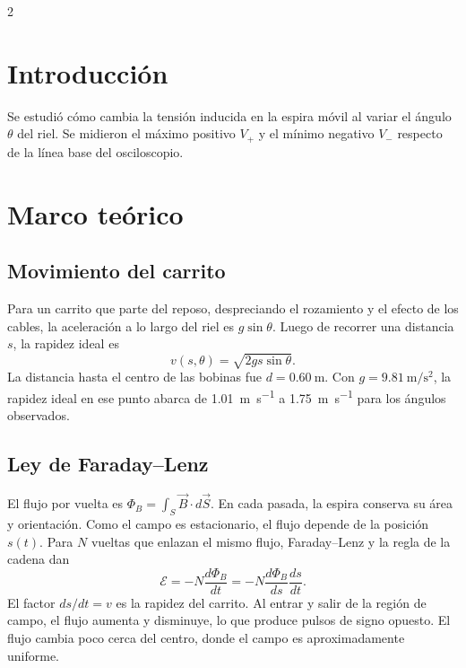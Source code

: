\documentclass[10pt,letterpaper]{article}
\begin{document}
\begin{multicols}{2}
\raggedcolumns
\section{Introducción}
Se estudió cómo cambia la tensión inducida en la espira móvil al variar el ángulo $\theta$ del riel. Se midieron el máximo positivo $V_+$ y el mínimo negativo $V_-$ respecto de la línea base del osciloscopio.

\section{Marco teórico}
\subsection{Movimiento del carrito}
Para un carrito que parte del reposo, despreciando el rozamiento y el efecto de los cables, la aceleración a lo largo del riel es $g\sin\theta$. Luego de recorrer una distancia $s$, la rapidez ideal es
\begin{equation}
  v(s,\theta)=\sqrt{2gs\sin\theta}.
  \label{eq:velocidad}
\end{equation}
La distancia hasta el centro de las bobinas fue $d=\qty{0.60}{\metre}$. Con $g=\qty{9.81}{\metre\per\second\squared}$, la rapidez ideal en ese punto abarca de \qty{1.01}{\metre\per\second} a \qty{1.75}{\metre\per\second} para los ángulos observados.

\subsection{Ley de Faraday--Lenz}
El flujo por vuelta es $\Phi_B=\int_S \vec B\cdot d\vec S$. En cada pasada, la espira conserva su área y orientación. Como el campo es estacionario, el flujo depende de la posición $s(t)$. Para $N$ vueltas que enlazan el mismo flujo, Faraday--Lenz y la regla de la cadena dan \cite{serway2009}
\begin{equation}
  \mathcal E=-N\frac{d\Phi_B}{dt}=-N\frac{d\Phi_B}{ds}\frac{ds}{dt}.
  \label{eq:faraday}
\end{equation}
El factor $ds/dt=v$ es la rapidez del carrito. Al entrar y salir de la región de campo, el flujo aumenta y disminuye, lo que produce pulsos de signo opuesto. El flujo cambia poco cerca del centro, donde el campo es aproximadamente uniforme.

\columnbreak


\end{multicols}
\end{document}

